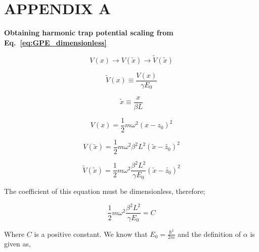 \documentclass[a4paper,times,hidelinks,12pt]{article}
\begin{document}
\clearpage

\clearpage




\appendix
\section{APPENDIX A}
\label{ap:scale}

\textbf{Obtaining harmonic trap potential scaling from Eq.~\eqref{eq:GPE_dimensionless}}

\begin{equation}
\label{eq:GPESCALE_harmonic_potential_transform}
    V(x) \rightarrow V(\widetilde{x}) \rightarrow \widetilde{V}(\widetilde{x})
\end{equation}

\begin{equation}
\label{eq:GPESCALE_dimensionless_harmonic_potential}
    \widetilde{V}(x) \equiv \frac{V(x)}{\gamma E_0}
\end{equation}

\begin{equation}
\label{eq:GPESCALE_dimensionless_length}
    \widetilde{x} \equiv \frac{x}{\beta L} 
\end{equation}

\begin{equation}
\label{eq:GPESCALE_harmonic_potential}
    V(x) = \frac{1}{2}m\omega^2 (x-z_0)^2
\end{equation}

\begin{equation}
\label{eq:GPESCALE_harmonic_length_transform}
    V(\widetilde{x}) = \frac{1}{2}m\omega^2 \beta^2 L^2 (\widetilde{x}-\widetilde{z_0})^2
\end{equation}

\begin{equation}
\label{eq:GPESCALE_harmonic_energy_transform}
    \widetilde{V}(\widetilde{x}) = \frac{1}{2} m\omega^2 \frac{\beta^2 L^2}{\gamma E_0} (\widetilde{x}-\widetilde{z_0})^2  
\end{equation}

The coefficient of this equation must be dimensionless, therefore;

\begin{equation}
\label{eq:GPESCALE_harmonic_coeff}
    \frac{1}{2} m\omega^2 \frac{\beta^2 L^2}{\gamma E_0} = C
\end{equation}

Where $C$ is a positive constant. We know that $E_0 = \frac{\hbar^2}{2m}$ and the definition of $\alpha$ is given as,
\end{document}
